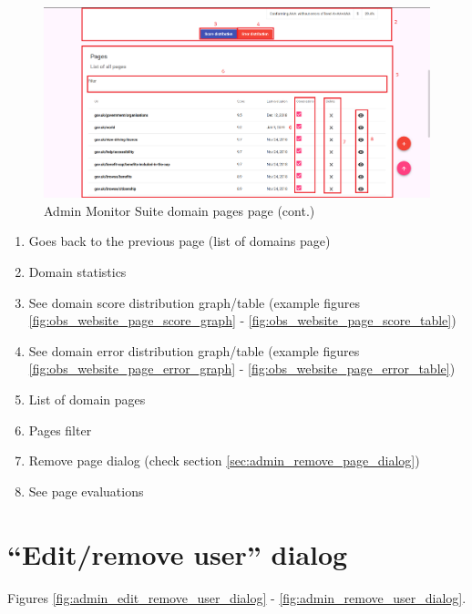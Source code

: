 \begin{figure}[H]
    \centering
    \includegraphics[width=\linewidth]{lib/images/admin/admin_domain_pages_page_2.png}
    \caption{Admin Monitor Suite domain pages page (cont.)}
    \label{fig:admin_domain_pages_page_2}
\end{figure}

\begin{enumerate}
    \item Goes back to the previous page (list of domains page)
    \item Domain statistics
    \item See domain score distribution graph/table (example figures \ref{fig:obs_website_page_score_graph} - \ref{fig:obs_website_page_score_table})
    \item See domain error distribution graph/table (example figures \ref{fig:obs_website_page_error_graph} - \ref{fig:obs_website_page_error_table})
    \item List of domain pages
    \item Pages filter
    \item Remove page dialog (check section \ref{sec:admin_remove_page_dialog})
    \item See page evaluations
\end{enumerate}

\clearpage

\section{``Edit/remove user'' dialog}
\label{sec:admin_edit_user_dialog}

Figures \ref{fig:admin_edit_remove_user_dialog} - \ref{fig:admin_remove_user_dialog}.

